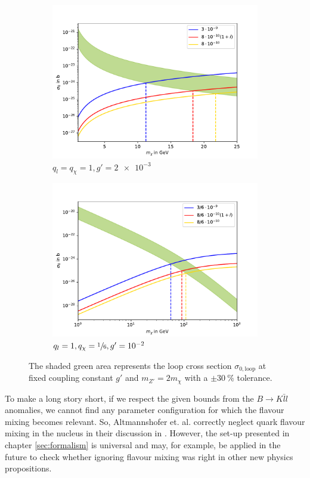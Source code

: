 \begin{figure}
	\centering
	\begin{subfigure}[]{0.8\textwidth}
		\includegraphics[width=\textwidth]{content/graphics/Relic11.pdf}
		\caption{$q_l=q_\chi=1,g'=\SI{2e-3}{}$}
		\label{fig:Relic11}
	\end{subfigure}
	\begin{subfigure}[]{0.8\textwidth}
		\includegraphics[width=\textwidth]{content/graphics/Relic116.pdf}
		\caption{$q_l=1,q_\chi=\sfrac{1}{6},g'=\SI{e-2}{}$}
		\label{fig:Relic116}
	\end{subfigure}
	\caption{The shaded green area represents the loop cross section $\sigma_{0,\text{loop}}$ at fixed coupling constant $g'$ and $m_{Z'} = 2m_\chi$ with a $\pm\SI{30}{\%}$ tolerance.}
	\label{fig:Relic}
\end{figure}

\clearpage
To make a long story short, if we respect the given bounds from the $B\rightarrow K\bar{l}l$ anomalies, we cannot find any parameter configuration for which the flavour mixing becomes relevant. So, Altmannshofer et. al. correctly neglect quark flavour mixing in the nucleus in their discussion in \cite{Z}. However, the set-up presented in chapter \ref{sec:formalism} is universal and may, for example, be applied in the future to check whether ignoring flavour mixing was right in other new physics propositions.